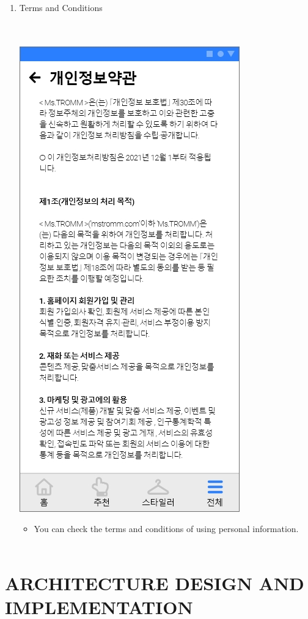 \documentclass[conference]{IEEEtran}
\begin{document}
\begin{enumerate}
    \item Terms and Conditions \\ \\ \\
    \centerline{\includegraphics[scale=0.32]{assets/개인정보약관.jpg}}
    \begin{itemize}
    \item[]You can check the terms and conditions of using personal information. \\ \\ 
    \end{itemize}
\end{enumerate}

\section{ARCHITECTURE DESIGN AND IMPLEMENTATION}
\end{document}

